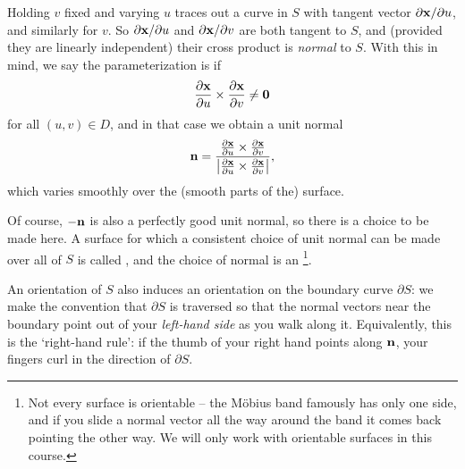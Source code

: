 \documentclass[a4paper]{scrartcl}
\begin{document}
Holding $v$ fixed and varying $u$ traces out a curve in $S$ with tangent vector $\partial \mathbf{x}/\partial u$, and similarly for $v$. So $\partial \mathbf{x} / \partial u$ and $\partial \mathbf{x}/\partial v$ are both tangent to $S$, and (provided they are linearly independent) their cross product is \emph{normal} to $S$. With this in mind, we say the parameterization is  if
$$
\frac{\partial \mathbf{x}}{\partial u} \times \frac{\partial \mathbf{x}}{\partial v} \neq \mathbf{0}
$$
for all $(u, v) \in D$, and in that case we obtain a unit normal
$$
\mathbf{n} = \frac{\frac{\partial \mathbf{x}}{\partial u} \times \frac{\partial \mathbf{x}}{\partial v}}{\left|\frac{\partial \mathbf{x}}{\partial u} \times \frac{\partial \mathbf{x}}{\partial v}\right|},
$$
which varies smoothly over the (smooth parts of the) surface.

Of course, $-\mathbf{n}$ is also a perfectly good unit normal, so there is a choice to be made here. A surface for which a consistent choice of unit normal can be made over all of $S$ is called , and the choice of normal is an \footnote{Not every surface is orientable -- the M\"obius band famously has only one side, and if you slide a normal vector all the way around the band it comes back pointing the other way. We will only work with orientable surfaces in this course.}.

An orientation of $S$ also induces an orientation on the boundary curve $\partial S$: we make the convention that $\partial S$ is traversed so that the normal vectors near the boundary point out of your \emph{left-hand side} as you walk along it. Equivalently, this is the `right-hand rule': if the thumb of your right hand points along $\mathbf{n}$, your fingers curl in the direction of $\partial S$.

\begin{center}
\end{center}
\end{document}
